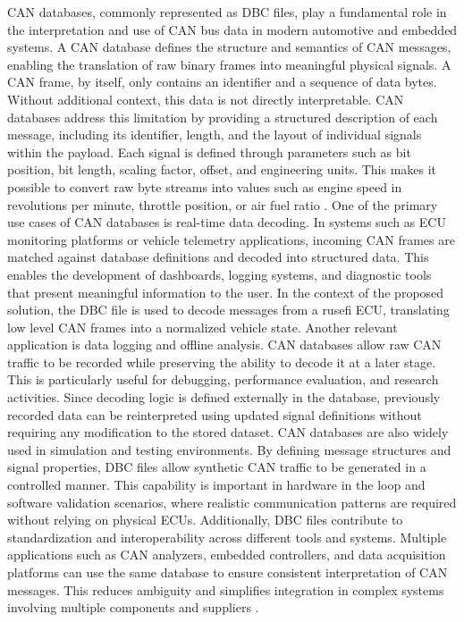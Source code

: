 CAN databases, commonly represented as DBC files, play a fundamental role in the interpretation and use of CAN bus data in modern automotive and embedded systems. A CAN database defines the structure and semantics of CAN messages, enabling the translation of raw binary frames into meaningful physical signals.
A CAN frame, by itself, only contains an identifier and a sequence of data bytes. Without additional context, this data is not directly interpretable. CAN databases address this limitation by providing a structured description of each message, including its identifier, length, and the layout of individual signals within the payload. Each signal is defined through parameters such as bit position, bit length, scaling factor, offset, and engineering units. This makes it possible to convert raw byte streams into values such as engine speed in revolutions per minute, throttle position, or air fuel ratio \cite{vectorcandb}. 
One of the primary use cases of CAN databases is real-time data decoding. In systems such as ECU monitoring platforms or vehicle telemetry applications, incoming CAN frames are matched against database definitions and decoded into structured data. This enables the development of dashboards, logging systems, and diagnostic tools that present meaningful information to the user. In the context of the proposed solution, the DBC file is used to decode messages from a rusefi ECU, translating low level CAN frames into a normalized vehicle state.
Another relevant application is data logging and offline analysis. CAN databases allow raw CAN traffic to be recorded while preserving the ability to decode it at a later stage. This is particularly useful for debugging, performance evaluation, and research activities. Since decoding logic is defined externally in the database, previously recorded data can be reinterpreted using updated signal definitions without requiring any modification to the stored dataset.
CAN databases are also widely used in simulation and testing environments. By defining message structures and signal properties, DBC files allow synthetic CAN traffic to be generated in a controlled manner. This capability is important in hardware in the loop and software validation scenarios, where realistic communication patterns are required without relying on physical ECUs.
Additionally, DBC files contribute to standardization and interoperability across different tools and systems. Multiple applications such as CAN analyzers, embedded controllers, and data acquisition platforms can use the same database to ensure consistent interpretation of CAN messages. This reduces ambiguity and simplifies integration in complex systems involving multiple components and suppliers \cite{pfeiffer}.

